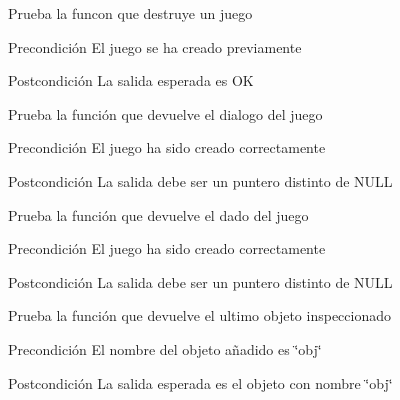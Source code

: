 \begin{DoxyRefList}
\item[\label{test__test000061}%
\hypertarget{test__test000061}{}%
Global \hyperlink{game__test_8c_abb9b53b5dbd1f36a9518e11c0a0bee16}{test1\-\_\-game\-\_\-destroy} ()]Prueba la funcon que destruye un juego \begin{DoxyPrecond}{Precondición}
El juego se ha creado previamente 
\end{DoxyPrecond}
\begin{DoxyPostcond}{Postcondición}
La salida esperada es O\-K  
\end{DoxyPostcond}

\item[\label{test__test000111}%
\hypertarget{test__test000111}{}%
Global \hyperlink{game__test_8c_abc8a5f3d547dee89072ac229b368abd7}{test1\-\_\-game\-\_\-get\-\_\-dialogue} ()]Prueba la función que devuelve el dialogo del juego \begin{DoxyPrecond}{Precondición}
El juego ha sido creado correctamente 
\end{DoxyPrecond}
\begin{DoxyPostcond}{Postcondición}
La salida debe ser un puntero distinto de N\-U\-L\-L  
\end{DoxyPostcond}

\item[\label{test__test000095}%
\hypertarget{test__test000095}{}%
Global \hyperlink{game__test_8c_af0b22cbab35095c34f331669cb9bc2fb}{test1\-\_\-game\-\_\-get\-\_\-die} ()]Prueba la función que devuelve el dado del juego \begin{DoxyPrecond}{Precondición}
El juego ha sido creado correctamente 
\end{DoxyPrecond}
\begin{DoxyPostcond}{Postcondición}
La salida debe ser un puntero distinto de N\-U\-L\-L  
\end{DoxyPostcond}

\item[\label{test__test000103}%
\hypertarget{test__test000103}{}%
Global \hyperlink{game__test_8c_a11afd634ae37c29f71e4615fa6bebeee}{test1\-\_\-game\-\_\-get\-\_\-last\-\_\-inspected\-\_\-object} ()]Prueba la función que devuelve el ultimo objeto inspeccionado \begin{DoxyPrecond}{Precondición}
El nombre del objeto añadido es \char`\"{}obj\char`\"{} 
\end{DoxyPrecond}
\begin{DoxyPostcond}{Postcondición}
La salida esperada es el objeto con nombre \char`\"{}obj\char`\"{}  
\end{DoxyPostcond}


\end{DoxyRefList}
